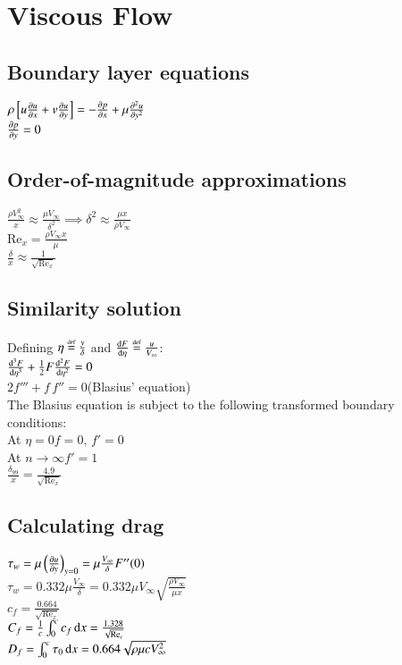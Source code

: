 \section{Viscous Flow}
\subsection*{Boundary layer equations}
$\rho\left[u\pdv{u}{x}+v\pdv{u}{y}\right]=-\pdv{p}{x}+\mu\pdv[order=2]{u}{y}$\\
$\pdv{p}{y}=0$
\subsection*{Order-of-magnitude approximations}
$\frac{\rho V_\infty^2}{x}\approx\frac{\mu V_\infty}{\delta^2}\implies\delta^2\approx\frac{\mu x}{\rho V_\infty}$\\
$\text{Re}_x=\frac{\rho V_\infty x}{\mu}$\\
$\frac{\delta}{x}\approx\frac{1}{\sqrt{\text{Re}_x}}$
\subsection*{Similarity solution}
Defining $\eta\overset {\underset {\mathrm {def} }{}}{=}\frac{y}{\delta}$ and $\odv{F}{\eta}\defequals\frac{u}{V_\infty}$:\\
$\odv[order=3]{F}{\eta}+\frac{1}{2}F\odv[order=2]{F}{\eta}=0$\hfill{}\\
$2f'''+f\,f''=0$\hfill(Blasius' equation)\\
The Blasius equation is subject to the following transformed boundary conditions:\\
At $\eta=0$\hfill $f=0,\,f'=0$\\
At $n\to\infty$\hfill $f'=1$\\
$\frac{\delta_{99}}{x}=\frac{4.9}{\sqrt{\text{Re}_x}}$\\
\subsection*{Calculating drag}
$\tau_w=\mu\left(\pdv{u}{y}\right)_{y=0}=\mu\frac{V_\infty}{\delta}F''(0)$\\
$\tau_w=0.332\mu\frac{V_\infty}{\delta}=0.332\mu V_\infty\sqrt{\frac{\rho V_\infty}{\mu x}}$\\
$c_f=\frac{0.664}{\sqrt{\text{Re}_x}}$\\
$C_f=\frac{1}{c}\int_0^c c_f\odif{x}=\frac{1.328}{\sqrt{\text{Re}_c}}$\\
$D_f=\int_0^c\tau_0\odif{x}=0.664\sqrt{\rho\mu c V_\infty^2}$
